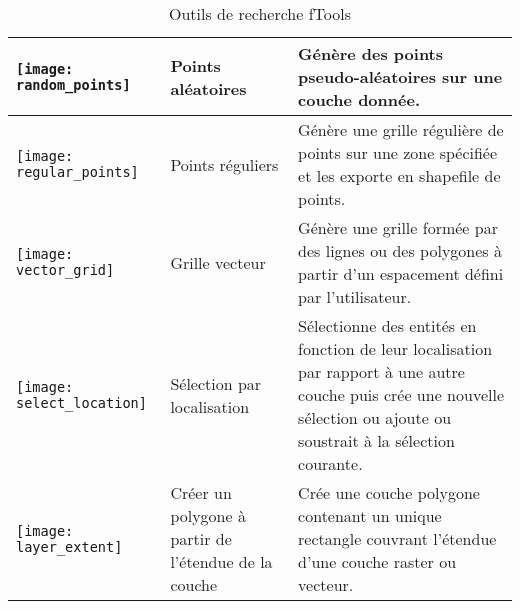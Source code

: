 \begin{table}[ht]
\begin{tabular}{|m{1cm}|m{3cm}|m{9cm}|}
 \hline \texttt{[image: random\_points]} & Points aléatoires & Génère des points pseudo-aléatoires sur une couche donnée. \\
 \hline \texttt{[image: regular\_points]} & Points réguliers & Génère une grille régulière de points sur une zone spécifiée et les exporte en shapefile de points. \\
 \hline \texttt{[image: vector\_grid]} & Grille vecteur & Génère une grille formée par des lignes ou des polygones à partir d'un espacement défini par l'utilisateur. \\
 \hline \texttt{[image: select\_location]} & Sélection par localisation & Sélectionne des entités en fonction de leur localisation par rapport à une autre couche puis crée une nouvelle sélection ou ajoute ou soustrait à la sélection courante. \\
\hline \texttt{[image: layer\_extent]} & Créer un polygone à partir de l'étendue de la couche & Crée une couche polygone contenant un unique rectangle couvrant l'étendue d'une couche raster ou vecteur. \\
 \hline
\end{tabular}
\caption{Outils de recherche fTools}\label{tab:ftool_research}
\end{table}

